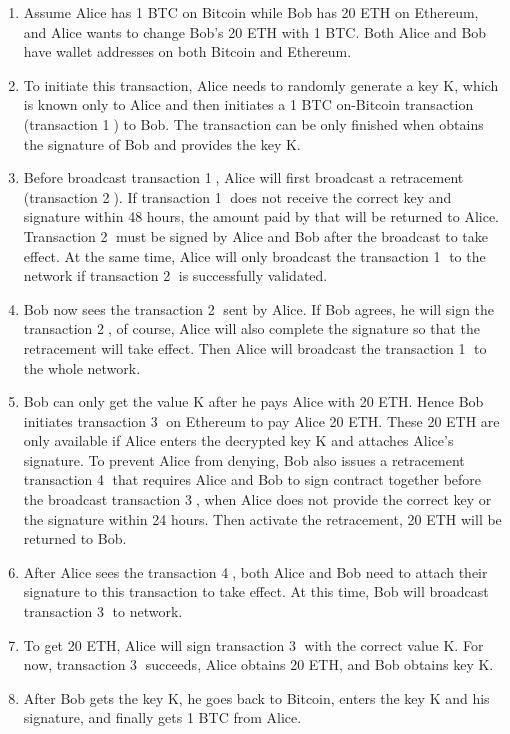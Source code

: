 \begin{enumerate}
  \item Assume Alice has 1 BTC on Bitcoin while Bob has 20 ETH on Ethereum, and Alice wants to change Bob's 20 ETH with 1 BTC. Both Alice and Bob have wallet addresses on both Bitcoin and Ethereum.
    \item To initiate this transaction, Alice needs to randomly generate a key K, which is known only to Alice and then initiates a 1 BTC on-Bitcoin transaction (transaction \textcircled{1}) to Bob. The transaction can be only finished when obtains the signature of Bob and provides the key K.
    \item Before broadcast transaction \textcircled{1}, Alice will first broadcast a retracement (transaction \textcircled{2}). If transaction \textcircled{1} does not receive the correct key and signature within 48 hours, the amount paid by that will be returned to Alice. Transaction \textcircled{2} must be signed by Alice and Bob after the broadcast to take effect. At the same time, Alice will only broadcast the transaction \textcircled{1} to the network if transaction \textcircled{2} is successfully validated.
    \item Bob now sees the transaction \textcircled{2} sent by Alice. If Bob agrees, he will sign the transaction \textcircled{2}, of course, Alice will also complete the signature so that the retracement will take effect. Then Alice will broadcast the transaction \textcircled{1} to the whole network.
    \item Bob can only get the value K after he pays Alice with 20 ETH. Hence Bob initiates transaction \textcircled{3} on Ethereum to pay Alice 20 ETH. These 20 ETH are only available if Alice enters the decrypted key K and attaches Alice's signature. To prevent Alice from denying, Bob also issues a retracement transaction \textcircled{4} that requires Alice and Bob to sign contract together before the broadcast transaction \textcircled{3}, when Alice does not provide the correct key or the signature within 24 hours. Then activate the retracement, 20 ETH will be returned to Bob.
    \item After Alice sees the transaction \textcircled{4}, both Alice and Bob need to attach their signature to this transaction to take effect. At this time, Bob will broadcast transaction \textcircled{3} to network.
    \item To get 20 ETH, Alice will sign transaction \textcircled{3} with the correct value K. For now, transaction \textcircled{3} succeeds, Alice obtains 20 ETH, and Bob obtains key K.
    \item After Bob gets the key K, he goes back to Bitcoin, enters the key K and his signature, and finally gets 1 BTC from Alice.
\end{enumerate}
